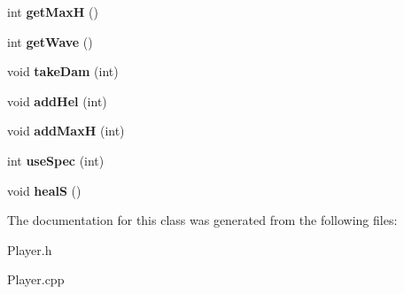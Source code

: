 \begin{DoxyCompactItemize}
\item 
\hypertarget{class_player_ac7aacd74bb813b02a2ade0550ed4f919}{}int {\bfseries get\+Max\+H} ()\label{class_player_ac7aacd74bb813b02a2ade0550ed4f919}

\item 
\hypertarget{class_player_aac6425c7618a5983547c738a7805b366}{}int {\bfseries get\+Wave} ()\label{class_player_aac6425c7618a5983547c738a7805b366}

\item 
\hypertarget{class_player_af3323298e57e03ac691a3ef51f8aac3a}{}void {\bfseries take\+Dam} (int)\label{class_player_af3323298e57e03ac691a3ef51f8aac3a}

\item 
\hypertarget{class_player_a7f2cfebb51e37100d88c18a32f59390c}{}void {\bfseries add\+Hel} (int)\label{class_player_a7f2cfebb51e37100d88c18a32f59390c}

\item 
\hypertarget{class_player_aed26f4fe5c8c0efb78db15f7201ebe42}{}void {\bfseries add\+Max\+H} (int)\label{class_player_aed26f4fe5c8c0efb78db15f7201ebe42}

\item 
\hypertarget{class_player_a98aaf0cf817e3d53b751607cfd90d853}{}int {\bfseries use\+Spec} (int)\label{class_player_a98aaf0cf817e3d53b751607cfd90d853}

\item 
\hypertarget{class_player_a675a06f05f356db61b8ebbb19c461ee3}{}void {\bfseries heal\+S} ()\label{class_player_a675a06f05f356db61b8ebbb19c461ee3}

\end{DoxyCompactItemize}


The documentation for this class was generated from the following files\+:\begin{DoxyCompactItemize}
\item 
Player.\+h\item 
Player.\+cpp\end{DoxyCompactItemize}
